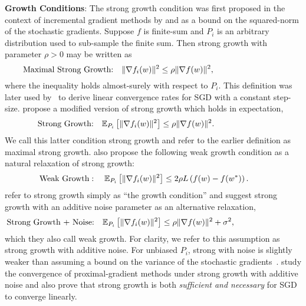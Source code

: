 \noindent \textbf{Growth Conditions}:
The strong growth condition was first proposed in the context of incremental gradient methods by \citet{solodov1998incremental} and \citet{tseng1998incremental} as a bound on the squared-norm of the stochastic gradients.
Suppose \( f \) is finite-sum and \( P_i \) is an arbitrary distribution used to sub-sample the finite sum. 
    Then strong growth with parameter \( \rho > 0 \) may be written as 
\[ \text{Maximal Strong Growth:} \quad \|\nabla f_i(w)\|^2 \leq \rho \|\nabla f(w)\|^2, \hspace{8.5em} \]
where the inequality holds almost-surely with respect to \( P_i \).
This definition was later used by~\citet{schmidt2013fast} to derive linear convergence rates for \ac{SGD} with a constant step-size. 
\citet{vaswani2019fast} propose a modified version of strong growth which holds in expectation,
\[ \text{Strong Growth:} \quad \mathbb{E}_{P_i} \left[\|\nabla f_i(w)\|^2\right] \leq \rho \|\nabla f(w)\|^2. \hspace{6.6em} \]
We call this latter condition strong growth and refer to the earlier definition as maximal strong growth.
\citet{vaswani2019fast} also propose the following weak growth condition as a natural relaxation of strong growth: 
\[ \text{Weak Growth}: \quad \mathbb{E}_{P_i}\left[\|\nabla f_i(w)\|^2\right] \leq 2 \rho L \left(f(w) - f(w^*)\right). \hspace{2.2em} \]
\citet{cevher2018linear} refer to strong growth simply as ``the growth condition'' and suggest strong growth with an additive noise parameter as an alternative relaxation, 
\[ \text{Strong Growth + Noise:} \quad \mathbb{E}_{P_i} \left[\|\nabla f_i(w)\|^2\right] \leq \rho \|\nabla f(w)\|^2 + \sigma^2, \hspace{8em} \]
which they also call weak growth.
For clarity, we refer to this assumption as strong growth with additive noise.
For unbiased \( P_i \), strong with noise is slightly weaker than assuming a bound on the variance of the stochastic gradients~\citep{khaled2020better, ghadimi2012optimal1}.
\citet{cevher2018linear} study the convergence of proximal-gradient methods under strong growth with additive noise and also prove that strong growth is both \emph{sufficient and necessary} for \ac{SGD} to converge linearly.\\


